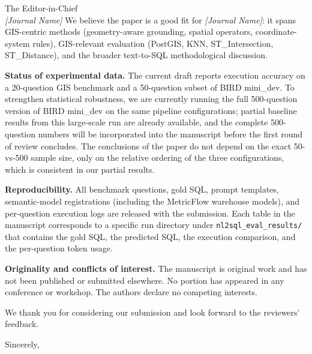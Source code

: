 \documentclass[11pt]{letter}
\begin{document}
\begin{letter}{The Editor-in-Chief \\ \emph{[Journal Name]}}
We believe the paper is a good fit for \emph{[Journal Name]}: it spans GIS-centric methods (geometry-aware grounding, spatial operators, coordinate-system rules), GIS-relevant evaluation (PostGIS, KNN, ST\_Intersection, ST\_Distance), and the broader text-to-SQL methodological discussion.

\medskip
\noindent\textbf{Status of experimental data.} The current draft reports execution accuracy on a 20-question GIS benchmark and a 50-question subset of BIRD mini\_dev. To strengthen statistical robustness, we are currently running the full 500-question version of BIRD mini\_dev on the same pipeline configurations; partial baseline results from this large-scale run are already available, and the complete 500-question numbers will be incorporated into the manuscript before the first round of review concludes. The conclusions of the paper do not depend on the exact 50-vs-500 sample size, only on the relative ordering of the three configurations, which is consistent in our partial results.

\medskip
\noindent\textbf{Reproducibility.} All benchmark questions, gold SQL, prompt templates, semantic-model registrations (including the MetricFlow warehouse models), and per-question execution logs are released with the submission. Each table in the manuscript corresponds to a specific run directory under \texttt{nl2sql\_eval\_results/} that contains the gold SQL, the predicted SQL, the execution comparison, and the per-question token usage.

\medskip
\noindent\textbf{Originality and conflicts of interest.} The manuscript is original work and has not been published or submitted elsewhere. No portion has appeared in any conference or workshop. The authors declare no competing interests.

We thank you for considering our submission and look forward to the reviewers' feedback.

\closing{Sincerely,}

\end{letter}
\end{document}
